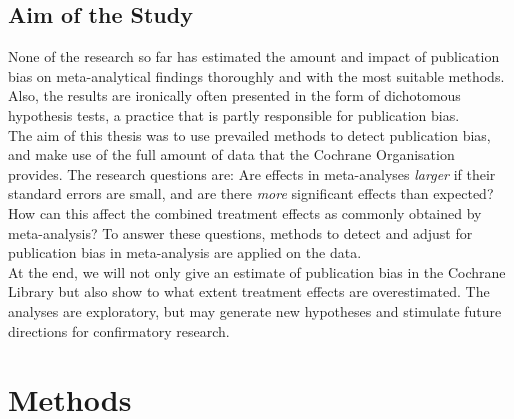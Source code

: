 \documentclass[11pt,a4paper,twoside]{book}\usepackage[]{graphicx}\usepackage[]{color}
\begin{document}
\section{Aim of the Study}
None of the research so far has estimated the amount and impact of publication bias on meta-analytical findings thoroughly and with the most suitable methods. Also, the results are ironically often presented in the form of dichotomous hypothesis tests, a practice that is partly responsible for publication bias.\\
The aim of this thesis was to use prevailed methods to detect publication bias, and make use of the full amount of data that the Cochrane Organisation provides. The research questions are: Are effects in meta-analyses \textit{larger} if their standard errors are small, and are there \textit{more} significant effects than expected? How can this affect the combined treatment effects as commonly obtained by meta-analysis? To answer these questions, methods to detect and adjust for publication bias in meta-analysis are applied on the data.\\
At the end, we will not only give an estimate of publication bias in the Cochrane Library but also show to what extent treatment effects are overestimated. The analyses are exploratory, but may generate new hypotheses and stimulate future directions for confirmatory research.








\chapter{Methods} \label{ch:methods}
\end{document}
